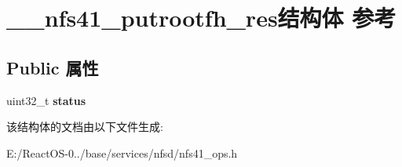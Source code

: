 \hypertarget{struct____nfs41__putrootfh__res}{}\section{\+\_\+\+\_\+nfs41\+\_\+putrootfh\+\_\+res结构体 参考}
\label{struct____nfs41__putrootfh__res}
\subsection*{Public 属性}
\begin{DoxyCompactItemize}
\item 
\mbox{\label{struct____nfs41__putrootfh__res_a51be97fba7b0d7922fb18e85521ded3f}} 
uint32\+\_\+t {\bfseries status}
\end{DoxyCompactItemize}


该结构体的文档由以下文件生成\+:\begin{DoxyCompactItemize}
\item 
E\+:/\+React\+O\+S-\/0../base/services/nfsd/nfs41\+\_\+ops.\+h\end{DoxyCompactItemize}

